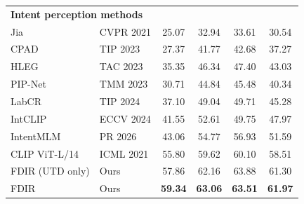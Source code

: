 \begin{table}[H]
\begin{tabular}{llcccc}
\hline
\multicolumn{6}{l}{\textbf{Intent perception methods}} \\
Jia \cite{jia_intentonomy_2021} & CVPR 2021 & 25.07 & 32.94 & 33.61 & 30.54 \\
CPAD \cite{ye_cross-modality_2023} & TIP 2023 & 27.37 & 41.77 & 42.68 & 37.27 \\
HLEG \cite{shi_learnable_2023} & TAC 2023 & 35.35 & 46.34 & 47.40 & 43.03 \\
PIP-Net \cite{wang_prototype-based_2023} & TMM 2023 & 30.71 & 44.84 & 45.48 & 40.34 \\
LabCR \cite{shi_label-aware_2024} & TIP 2024 & 37.10 & 49.04 & 49.71 & 45.28 \\
IntCLIP \cite{leonardis_synergy_2025} & ECCV 2024 & 41.55 & 52.61 & 49.75 & 47.97 \\
IntentMLM \cite{wang_unlocking_2026} & PR 2026 & 43.06 & 54.77 & 56.93 & 51.59 \\
\hline
CLIP ViT-L/14 \cite{radford_learning_2021} & ICML 2021 & 55.80 & 59.62 & 60.10 & 58.51 \\
FDIR (UTD only) & Ours & 57.86 & 62.16 & 63.88 & 61.30 \\
FDIR & Ours & \textbf{59.34} & \textbf{63.06} & \textbf{63.51} & \textbf{61.97} \\
\hline
\end{tabular}
\endgroup
\end{table}